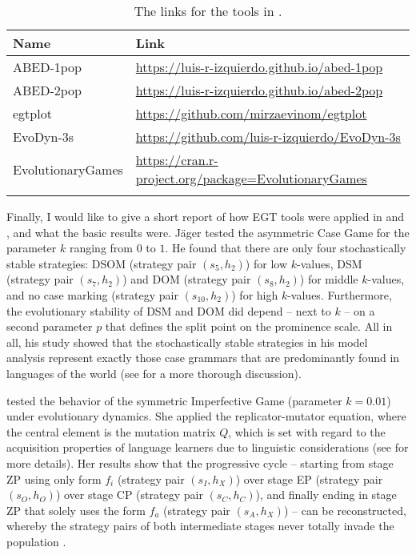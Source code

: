 \documentclass[output=paper,hidelinks]{langscibook}
\begin{document}
\begin{table}
\begin{tabularx}{\textwidth}{lQ} 
\lsptoprule
Name & Link\\
\midrule
ABED-1pop         & \url{https://luis-r-izquierdo.github.io/abed-1pop}\\
ABED-2pop         & \url{https://luis-r-izquierdo.github.io/abed-2pop}\\
egtplot           & \url{https://github.com/mirzaevinom/egtplot}\\
EvoDyn-3s         & \url{https://github.com/luis-r-izquierdo/EvoDyn-3s}\\
EvolutionaryGames & \url{https://cran.r-project.org/package=EvolutionaryGames}\\
 \lspbottomrule
\end{tabularx}
\caption{The links for the tools in .\label{tools-links}}
\end{table}

Finally, I would like to give a short report of how EGT tools were applied in \citet{Jaeger07} and \citet{Deo_2015}, and what the basic results were. Jäger tested the asymmetric Case Game for the parameter $k$ ranging from $0$ to $1$. He found that there are only four stochastically stable strategies: DSOM (strategy pair $(s_5,h_2)$) for low $k$-values, DSM (strategy pair $(s_7,h_2)$)  and DOM (strategy pair $(s_8,h_2)$)  for middle $k$-values, and no case marking (strategy pair $(s_{10},h_2)$)  for high $k$-values. Furthermore, the evolutionary stability of DSM and DOM did depend -- next to $k$ -- on a second parameter $p$ that defines the split point on the prominence scale. All in all, his study showed that the stochastically stable strategies in his model analysis represent exactly those case grammars that are predominantly found in languages of the world (see \citealt[Section 2]{Jaeger07} for a more thorough discussion).

\citet{Deo_2015} tested the behavior of the symmetric Imperfective Game (parameter $k=0.01$) under evolutionary dynamics. She applied the replicator-mutator equation, where the central element is the mutation matrix $Q$, which is set with regard to the acquisition properties of language learners due to linguistic considerations (see \citealt[38--44]{Deo_2015} for more details). Her results show that the progressive cycle -- starting from stage ZP using only form $f_i$ (strategy pair $(s_I,h_X)$) over stage EP (strategy pair $(s_O,h_O)$) over stage CP (strategy pair $(s_C,h_C)$), and finally ending in stage ZP that solely uses the form $f_a$ (strategy pair $(s_A,h_X)$) -- can be reconstructed, whereby the strategy pairs of both intermediate stages never totally invade the population \citep[see][Figure 4]{Deo_2015}. 
\end{document}
